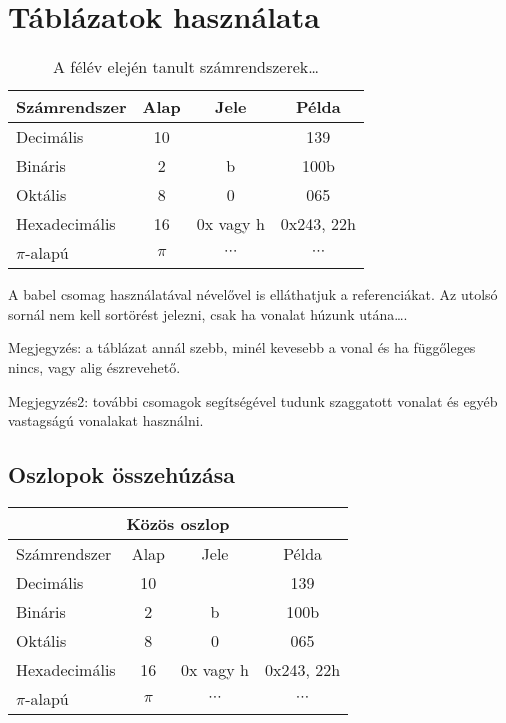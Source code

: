 \section{Táblázatok használata}\label{sec:tablazatok}    

	\begin{table}[!h]
		\begin{center}
        	\begin{tabular}{|l|ccc|}
            \hline
        	Számrendszer  &  Alap &	Jele      & Példa \\
            \hline
			Decimális 	  &  10   &	          & 139  \\
			Bináris 	  &  2 	  & b 	      & 100b \\
			Oktális 	  &  8    & 0 	      & 065 \\
			Hexadecimális &  16   &	0x vagy h & 0x243, 22h\\
            $\pi$-alapú   &  $\pi$ & $\cdots$ & $\cdots$ \\
            \hline
        	\end{tabular}		
		\end{center}
        \label{tab:szamrendszerek}
        \caption[Első táblázat]{A félév elején tanult számrendszerek\dots}
	\end{table}
    
    A babel csomag használatával névelővel is elláthatjuk
    a referenciákat.
    Az utolsó sornál nem kell sortörést jelezni, 
    csak ha vonalat húzunk utána\dots.
    
    Megjegyzés: a táblázat annál szebb, minél kevesebb a vonal
    és ha függőleges nincs, vagy alig észrevehető.
    
    Megjegyzés2: további csomagok segítségével tudunk
    szaggatott vonalat és egyéb vastagságú vonalakat használni.
    
    \subsection{Oszlopok összehúzása}
    	\begin{table}[!h]
		\begin{center}
        	\begin{tabular}{|lccc|}
            \hline
            \multicolumn{4}{|c|}{Közös oszlop}\\
            \hline
        	Számrendszer  &  Alap &	Jele      & Példa \\
            \hline
			Decimális 	  &  10   &	          & 139  \\
			Bináris 	  &  2 	  & b 	      & 100b \\
			Oktális 	  &  8    & 0 	      & 065 \\
			Hexadecimális &  16   &	0x vagy h & 0x243, 22h\\
            $\pi$-alapú   &  $\pi$ & $\cdots$ & $\cdots$ \\
            \hline
        	\end{tabular}		
		\end{center}
	\end{table}
    
